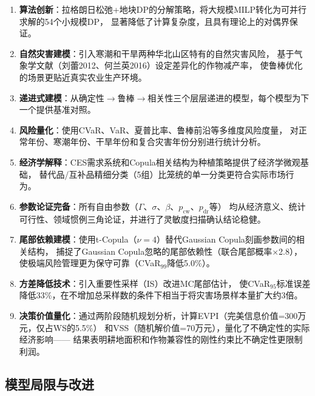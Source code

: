 \documentclass[12pt]{ctexart}
\begin{document}
\begin{enumerate}[label=(\arabic*), leftmargin=*]
    \item \textbf{算法创新}：拉格朗日松弛+地块DP的分解策略，将大规模MILP转化为可并行求解的54个小规模DP，
          显著降低了计算复杂度，且具有理论上的对偶界保证。
    \item \textbf{自然灾害建模}：引入寒潮和干旱两种华北山区特有的自然灾害风险，
          基于气象学文献（刘蕾2012、何兰英2016）设定差异化的作物减产率，
          使鲁棒优化的场景更贴近真实农业生产环境。
    \item \textbf{递进式建模}：从确定性$\to$鲁棒$\to$相关性三个层层递进的模型，每个模型为下一个提供基准对照。
    \item \textbf{风险量化}：使用CVaR、VaR、夏普比率、鲁棒前沿等多维度风险度量，
          对正常年份、寒潮年份、干旱年份和复合灾害年份分别进行统计分析。
    \item \textbf{经济学解释}：CES需求系统和Copula相关结构为种植策略提供了经济学微观基础，
          替代品/互补品精细分类（5组）比笼统的单一分类更符合实际市场行为。
    \item \textbf{参数论证完备}：所有自由参数（$\Gamma$、$\sigma$、$\beta$、$p_{\text{cw}}$、$p_{\text{dr}}$等）
          均从经济意义、统计可行性、领域惯例三角论证，并进行了灵敏度扫描确认结论稳健。
    \item \textbf{尾部依赖建模}：使用t-Copula（$\nu=4$）替代Gaussian Copula刻画参数间的相关结构，
          捕捉了Gaussian Copula忽略的尾部依赖性（联合尾部概率$\times$2.8），
          使极端风险管理更为保守可靠（CVaR$_{99}$降低5.0\%）。
    \item \textbf{方差降低技术}：引入重要性采样（IS）改进MC尾部估计，
          使CVaR$_{95}$标准误差降低33\%，在不增加总采样数的条件下相当于将灾害场景样本量扩大约3倍。
    \item \textbf{决策价值量化}：通过两阶段随机规划分析，计算EVPI（完美信息价值=300万元，仅占WS的5.5\%）
          和VSS（随机解价值=70万元），量化了不确定性的实际经济影响——
          结果表明耕地面积和作物兼容性的刚性约束比不确定性更限制利润。
\end{enumerate}

\subsection{模型局限与改进}
\end{document}
